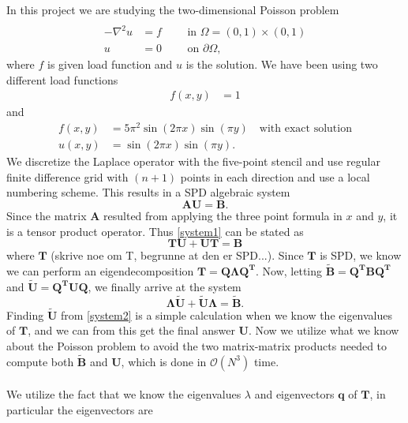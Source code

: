In this project we are studying the two-dimensional Poisson problem
\begin{align}\\
\label{Poisson}
-\nabla^2u&=f \quad\quad\text{ in } \Omega=(0,1)\times(0,1)\\
u&=0 \quad\quad\text{ on } \partial \Omega, \nonumber
\end{align}
where $f$ is given load function and $u$ is the solution. We have been using two different load functions
\begin{align*}
f(x,y)&=1
\end{align*}
and
\begin{align}
\label{loadfunc2}
f(x,y)&=5\pi^2\sin(2\pi x)\sin(\pi y) \quad\text{with exact solution} \\
u(x,y)&=\sin(2\pi x)\sin(\pi y).\nonumber
\end{align}
We discretize the Laplace operator with the five-point stencil and use regular finite difference grid with $(n+1)$ points in each direction and use a local numbering scheme. This results in a SPD algebraic system
\begin{equation}
	\mathbf{AU} = \mathbf{B}.
	\label{system1}
\end{equation}
Since the matrix $\mathbf{A}$ resulted from applying the three point formula in $x$ and $y$, it is a tensor product operator. Thus \eqref{system1} can be stated as 
\begin{equation}
	\mathbf{TU} + \mathbf{UT} = \mathbf{B}
\end{equation}
where $\mathbf{T}$ (skrive noe om T, begrunne at den er SPD...). Since $\mathbf{T}$ is SPD, we know we can perform an eigendecomposition $\mathbf{T} = \mathbf{Q\Lambda Q^T}$. Now, letting $\mathbf{\widetilde{B}} = \mathbf{Q^TBQ^T}$ and $\mathbf{\widetilde{U}} = \mathbf{Q^TUQ}$, we finally arrive at the system 
\begin{equation}
	\mathbf{\Lambda\widetilde{U}} + \mathbf{\widetilde{U}\Lambda} = \mathbf{\widetilde{B}}.
	\label{system2}
\end{equation}
Finding $\mathbf{\widetilde{U}}$ from \eqref{system2} is a simple calculation when we know the eigenvalues of $\mathbf{T}$, and we can from this get the final answer $\mathbf{U}$. Now we utilize what we know about the Poisson problem to avoid the two matrix-matrix products needed to compute both $\mathbf{\widetilde{B}}$ and $\mathbf{U}$, which is done in $\mathcal{O}(N^3)$ time. \\
\\
We utilize the fact that we know the eigenvalues $\lambda$ and eigenvectors $\mathbf{q}$ of $\mathbf{T}$, in particular the eigenvectors are 
